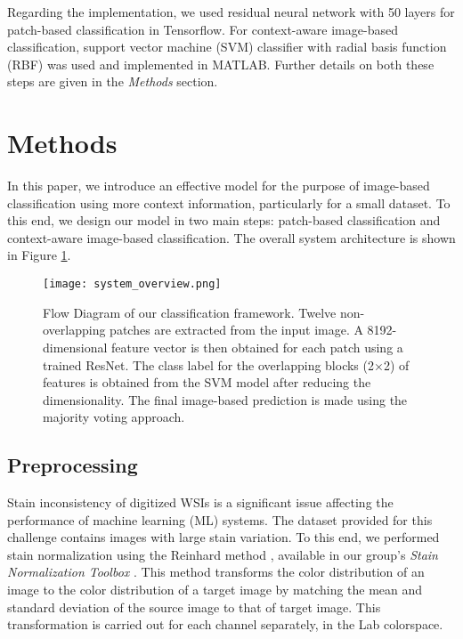 \documentclass[runningheads,a4paper]{llncs}
\begin{document}
Regarding the implementation, we used residual neural network with 50 layers for patch-based classification in Tensorflow. For context-aware image-based classification, support vector machine (SVM) classifier with radial basis function (RBF) was used and implemented in MATLAB. Further details on both these steps are given in the \textit{Methods} section.

\section{Methods}

In this paper, we introduce an effective model for the purpose of image-based classification using more context information, particularly for a small dataset. To this end, we design our model in two main steps: patch-based classification and context-aware image-based classification. The overall system architecture is shown in Figure \ref{fig:system_overview}.

\begin{figure}[ht]
\centering
\texttt{[image: system\_overview.png]}
\caption{Flow Diagram of our classification framework. Twelve non-overlapping patches are extracted from the input image. A 8192-dimensional feature vector is then obtained for each patch using a trained ResNet. The class label for the overlapping blocks (2$\times$2) of features is obtained from the SVM model after reducing the dimensionality. The final image-based prediction is made using the majority voting approach.   }
\label{fig:system_overview}
\end{figure}

\subsection{Preprocessing}

Stain inconsistency of digitized WSIs is a significant issue affecting the performance of machine learning (ML) systems. The dataset provided for this challenge contains images with large stain variation. To this end, we performed stain normalization using the Reinhard method \cite{reinhard2001color}, available in our group's \textit{Stain Normalization Toolbox} \cite{khan2014nonlinear}. This method transforms the color distribution of an image to the color distribution of a target image by matching the mean and standard deviation of the source image to that of target image. This transformation is carried out for each channel separately, in the Lab colorspace.
\end{document}
